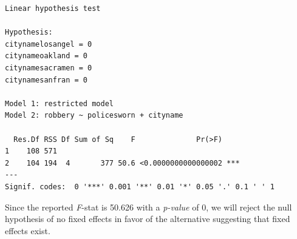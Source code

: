 \documentclass[]{book}
\newenvironment{Shaded}{\begin{snugshade}}{\end{snugshade}}
\newcommand{\CommentTok}[1]{\textcolor[rgb]{0.56,0.35,0.01}{\textit{#1}}}
\newcommand{\DataTypeTok}[1]{\textcolor[rgb]{0.13,0.29,0.53}{#1}}
\newcommand{\DecValTok}[1]{\textcolor[rgb]{0.00,0.00,0.81}{#1}}
\newcommand{\KeywordTok}[1]{\textcolor[rgb]{0.13,0.29,0.53}{\textbf{#1}}}
\newcommand{\NormalTok}[1]{#1}
\newcommand{\OperatorTok}[1]{\textcolor[rgb]{0.81,0.36,0.00}{\textbf{#1}}}
\newcommand{\StringTok}[1]{\textcolor[rgb]{0.31,0.60,0.02}{#1}}
\begin{document}
\begin{Shaded}
\end{Shaded}

\begin{verbatim}
Linear hypothesis test

Hypothesis:
citynamelosangel = 0
citynameoakland = 0
citynamesacramen = 0
citynamesanfran = 0

Model 1: restricted model
Model 2: robbery ~ policesworn + cityname

  Res.Df RSS Df Sum of Sq    F              Pr(>F)    
1    108 571                                          
2    104 194  4       377 50.6 <0.0000000000000002 ***
---
Signif. codes:  0 '***' 0.001 '**' 0.01 '*' 0.05 '.' 0.1 ' ' 1
\end{verbatim}

Since the reported \emph{F}-stat is 50.626 with a \emph{p-value} of 0, we will reject the null hypothesis of no fixed effects in favor of the alternative suggesting that fixed effects exist.
\end{document}
